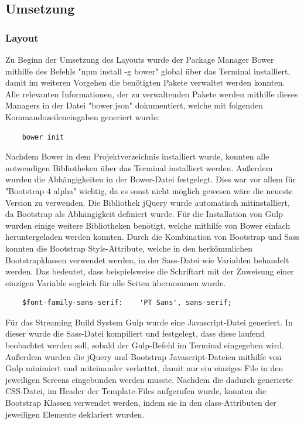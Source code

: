   \subsection{Umsetzung}

    \subsubsection{Layout}

Zu Beginn der Umsetzung des Layouts wurde der Package Manager Bower mithilfe des Befehls "npm install -g bower" global über das Terminal installiert, damit im weiteren Vorgehen die benötigten Pakete verwaltet werden konnten. Alle relevanten Informationen, der zu verwaltenden Pakete werden mithilfe dieses Managers in der Datei "bower.json" dokumentiert, welche mit folgenden Kommandozeileneingaben generiert wurde:
	\lstset{language = bash}
  	\begin{lstlisting}
  	bower init
  	\end{lstlisting}
Nachdem Bower in dem Projektverzeichnis installiert wurde, konnten alle notwendigen Bibliotheken über das Terminal installiert werden. Außerdem wurden die Abhängigkeiten in der Bower-Datei festgelegt. Dies war vor allem für "Bootstrap 4 alpha" wichtig, da es sonst nicht möglich gewesen wäre die neueste Version zu verwenden. Die Bibliothek jQuery wurde automatisch mitinstalliert, da Bootstrap als Abhängigkeit definiert wurde. Für die Installation von Gulp wurden einige weitere Bibliotheken benötigt, welche mithilfe von Bower einfach heruntergeladen werden konnten.
Durch die Kombination von Bootstrap und Sass konnten die Bootstrap Style-Attribute, welche in den herkömmlichen Bootstrapklassen verwendet werden, in der Sass-Datei wie Variablen behandelt werden. Das bedeutet, dass beispielsweise die Schriftart mit der Zuweisung einer einzigen Variable sogleich für alle Seiten übernommen wurde.
	\lstset{language = html}
  	\begin{lstlisting}
  	$font-family-sans-serif:	'PT Sans', sans-serif;
  	\end{lstlisting}
Für das Streaming Build System Gulp wurde eine Javascript-Datei generiert. In dieser wurde die Sass-Datei kompiliert und festgelegt, dass diese laufend beobachtet werden soll, sobald der Gulp-Befehl im Terminal eingegeben wird. Außerdem wurden die jQuery und Bootstrap Javascript-Dateien mithilfe von Gulp minimiert und miteinander verkettet, damit nur ein einziges File in den jeweiligen Screens eingebunden werden musste.
Nachdem die dadurch generierte CSS-Datei, im Header der Template-Files aufgerufen wurde, konnten die Bootstrap Klassen verwendet werden, indem sie in den class-Attributen der jeweiligen Elemente deklariert wurden.
